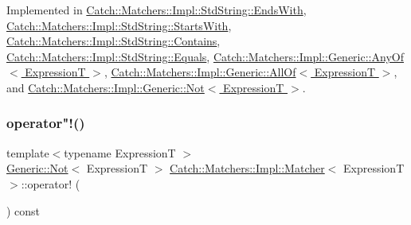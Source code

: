 Implemented in \hyperlink{struct_catch_1_1_matchers_1_1_impl_1_1_std_string_1_1_ends_with_aff66fb5af2d4f6161627cb20899b2c1b}{Catch\+::\+Matchers\+::\+Impl\+::\+Std\+String\+::\+Ends\+With}, \hyperlink{struct_catch_1_1_matchers_1_1_impl_1_1_std_string_1_1_starts_with_ab8f8d15e06d7ec13fee7d9ec4075dafa}{Catch\+::\+Matchers\+::\+Impl\+::\+Std\+String\+::\+Starts\+With}, \hyperlink{struct_catch_1_1_matchers_1_1_impl_1_1_std_string_1_1_contains_a2248f3d0d1eb5cf5a1059c183b811a7c}{Catch\+::\+Matchers\+::\+Impl\+::\+Std\+String\+::\+Contains}, \hyperlink{struct_catch_1_1_matchers_1_1_impl_1_1_std_string_1_1_equals_abf0a94b4e66dbd586268d9983f867e68}{Catch\+::\+Matchers\+::\+Impl\+::\+Std\+String\+::\+Equals}, \hyperlink{class_catch_1_1_matchers_1_1_impl_1_1_generic_1_1_any_of_adebd5437cdb8e0d54e16e97fe26e7e85}{Catch\+::\+Matchers\+::\+Impl\+::\+Generic\+::\+Any\+Of$<$ Expression\+T $>$}, \hyperlink{class_catch_1_1_matchers_1_1_impl_1_1_generic_1_1_all_of_a95231b6a455e1a646d0b54bce55138be}{Catch\+::\+Matchers\+::\+Impl\+::\+Generic\+::\+All\+Of$<$ Expression\+T $>$}, and \hyperlink{class_catch_1_1_matchers_1_1_impl_1_1_generic_1_1_not_a18c49fc6fb73a42d54650dafc18c7db1}{Catch\+::\+Matchers\+::\+Impl\+::\+Generic\+::\+Not$<$ Expression\+T $>$}.

\hypertarget{struct_catch_1_1_matchers_1_1_impl_1_1_matcher_a7ecd56842090611c9dbfc325b42fa942}{}\label{struct_catch_1_1_matchers_1_1_impl_1_1_matcher_a7ecd56842090611c9dbfc325b42fa942} 
\subsubsection{\texorpdfstring{operator"!()}{operator!()}}
{\footnotesize\ttfamily template$<$typename ExpressionT $>$ \\
\hyperlink{class_catch_1_1_matchers_1_1_impl_1_1_generic_1_1_not}{Generic\+::\+Not}$<$ ExpressionT $>$ \hyperlink{struct_catch_1_1_matchers_1_1_impl_1_1_matcher}{Catch\+::\+Matchers\+::\+Impl\+::\+Matcher}$<$ ExpressionT $>$\+::operator! (\begin{DoxyParamCaption}{ }\end{DoxyParamCaption}) const}

\hypertarget{struct_catch_1_1_matchers_1_1_impl_1_1_matcher_adb060f348e3ed404b80209fbc62174e1}{}\label{struct_catch_1_1_matchers_1_1_impl_1_1_matcher_adb060f348e3ed404b80209fbc62174e1} 
